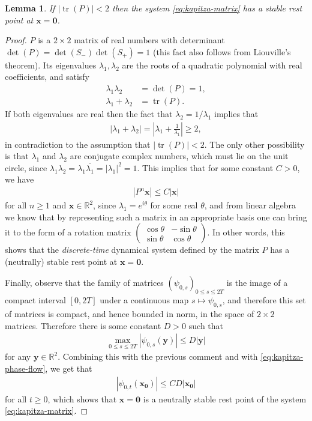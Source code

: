 \documentclass[12pt]{amsart}
\newcommand{\eqst}[1]{\begin{align*}#1\end{align*}}
\newcommand{\R}{\mathbb{R}}
\newtheorem{lem}[thm]{Lemma}
\begin{document}
\begin{lem}
If $|\operatorname{tr}(P)|<2$ then the system \eqref{eq:kapitza-matrix} has a stable rest point at $\mathbf{x}=\mathbf{0}$.
\end{lem}

\begin{proof}
$P$ is a $2\times 2$ matrix of real numbers with determinant $\det(P)=\det(S_-)\det(S_+)=1$ (this fact also follows from Liouville's theorem). Its eigenvalues $\lambda_1, \lambda_2$ are the roots of a quadratic polynomial with real coefficients, and satisfy 
\eqst{
\lambda_1 \lambda_2 &= \det(P)=1, \\ 
\lambda_1 + \lambda_2 &= \operatorname{tr}(P).
}
If both eigenvalues are real then the fact that $\lambda_2=1/\lambda_1$ implies that
\eqst{
|\lambda_1 + \lambda_2| = \left|\lambda_1 + \frac{1}{\lambda_1}\right| \ge 2,
}
in contradiction to the assumption that $|\operatorname{tr}(P)|<2$. The only other possibility is that $\lambda_1$ and $\lambda_2$ are conjugate complex numbers, which must lie on the unit circle, since $\lambda_1\lambda_2 = \lambda_1 \overline{\lambda_1}= |\lambda_1|^2 = 1$. This implies that for some constant $C>0$, we have
\eqst{
|P^n \mathbf{x}| \le C |\mathbf{x}|
}
for all $n\ge1$ and $\mathbf{x}\in \R^2$, since $\lambda_1=e^{i\theta}$ for some real $\theta$, and from linear algebra we know that by representing such a matrix in an appropriate basis one can bring it to the form of a rotation matrix $\left(\begin{array}{cc} \cos \theta & -\sin\theta \\ \sin\theta & \cos\theta\end{array} \right)$. In other words, this shows that the \emph{discrete-time} dynamical system defined by the matrix $P$ has a (neutrally) stable rest point at $\mathbf{x}=\mathbf{0}$.

Finally, observe that the family of matrices $(\psi_{0,s})_{0\le s\le 2T}$ is the image of a compact interval $[0,2T]$ under a continuous map $s\mapsto \psi_{0,s}$, and therefore this set of matrices is compact, and hence bounded in norm, in the space of $2\times 2$ matrices. Therefore there is some constant $D>0$ such that \eqst{
\max_{0\le s\le 2T} |\psi_{0,s}(\mathbf{y}) | \le D |\mathbf{y}|
}
for any $\mathbf{y}\in\R^2$. Combining this with the previous comment and with \eqref{eq:kapitza-phase-flow}, we get that
\eqst{
|\psi_{0,t} (\mathbf{x_0})| \le CD |\mathbf{x_0}|
}
for all $t\ge 0$, which shows that $\mathbf{x}=\mathbf{0}$ is a neutrally stable rest point of the system \eqref{eq:kapitza-matrix}.
\end{proof}
\end{document}
